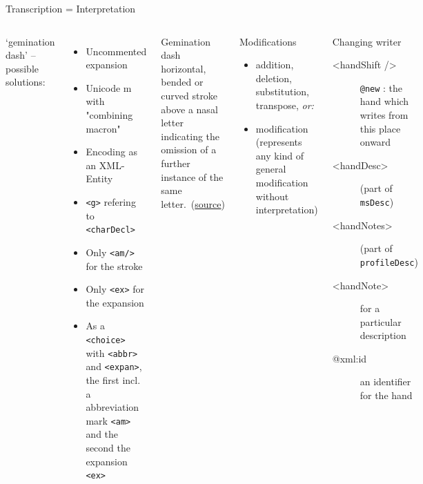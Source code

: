 
\begin{frame}{Transcription = Interpretation}
\small

\begin{columns}
\small
`gemination dash' – possible solutions:
\begin{itemize}\footnotesize
\item  Uncommented expansion
\item  Unicode m with "combining macron"
\item  Encoding as an XML-Entity
\item  \texttt{<g>} refering to \texttt{<charDecl>}
\item  Only \texttt{<am/>} for the stroke
\item  Only \texttt{<ex>} for the expansion
\item  As a \texttt{<choice>} with \texttt{<abbr>} and \texttt{<expan>}, the first incl.
a abbreviation mark \texttt{<am>} and the second the
expansion \texttt{<ex>}
\end{itemize}

\begin{block}{Gemination dash}\scriptsize
horizontal, bended or curved stroke above a nasal letter indicating the omission of a further instance of the same letter.~(\href{https://www.degruyter.com/database/WSK/entry/wsk_id_wsk_artikel_artikel_14933/html?lang=en}{source})
\end{block}

\begin{block}{Modifications}\footnotesize
\begin{itemize}
\item  addition, deletion, substitution, transpose, \emph{or:}
\item  modification (represents any kind of general
modification without interpretation)
\end{itemize}
\end{block}

\begin{alertblock}{Changing writer}\footnotesize
\begin{description}
\item[<handShift />] \texttt{@new} : the hand which writes from this place onward
\item[<handDesc>] (part of \texttt{msDesc}) 
\item[<handNotes>] (part of \texttt{profileDesc})
\item[<handNote>] for a particular description
\item[@xml:id] an identifier for the hand
\end{description}
\end{alertblock}
\end{columns}


\end{frame}

